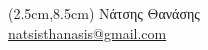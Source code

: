 \documentclass[noamsthm,12pt]{beamer}
\begin{document}

\begin{frame}[c]
\phantom{1}  \vfill \phantom{1}  \hfill \phantom{1}    \phantom{1}  \hfill \phantom{1}  \vfill \phantom{1} 

\begin{textblock*}{13cm}(2.5cm,8.5cm)
\scriptsize Νάτσης Θανάσης\\
\href{mailto:natsisthanasis@gmail.com}{\url{natsisthanasis@gmail.com}}
\end{textblock*}
\end{frame}
\end{document}
